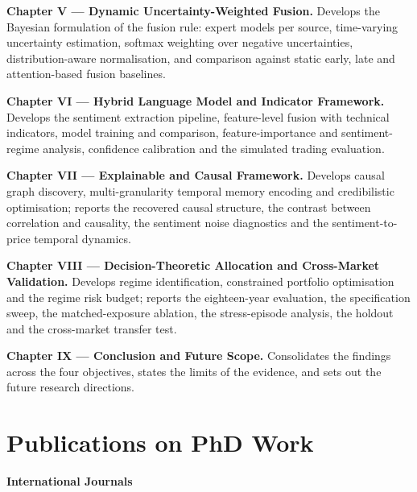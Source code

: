 \textbf{Chapter V --- Dynamic Uncertainty-Weighted Fusion.} Develops the Bayesian formulation
of the fusion rule: expert models per source, time-varying uncertainty estimation, softmax
weighting over negative uncertainties, distribution-aware normalisation, and comparison against
static early, late and attention-based fusion baselines.

\textbf{Chapter VI --- Hybrid Language Model and Indicator Framework.} Develops the sentiment
extraction pipeline, feature-level fusion with technical indicators, model training and
comparison, feature-importance and sentiment-regime analysis, confidence calibration and the
simulated trading evaluation.

\textbf{Chapter VII --- Explainable and Causal Framework.} Develops causal graph discovery,
multi-granularity temporal memory encoding and credibilistic optimisation; reports the
recovered causal structure, the contrast between correlation and causality, the sentiment
noise diagnostics and the sentiment-to-price temporal dynamics.

\textbf{Chapter VIII --- Decision-Theoretic Allocation and Cross-Market Validation.} Develops
regime identification, constrained portfolio optimisation and the regime risk budget; reports
the eighteen-year evaluation, the specification sweep, the matched-exposure ablation, the
stress-episode analysis, the holdout and the cross-market transfer test.

\textbf{Chapter IX --- Conclusion and Future Scope.} Consolidates the findings across the four
objectives, states the limits of the evidence, and sets out the future research directions.

\chapter*{Publications on PhD Work}

\textbf{International Journals}

